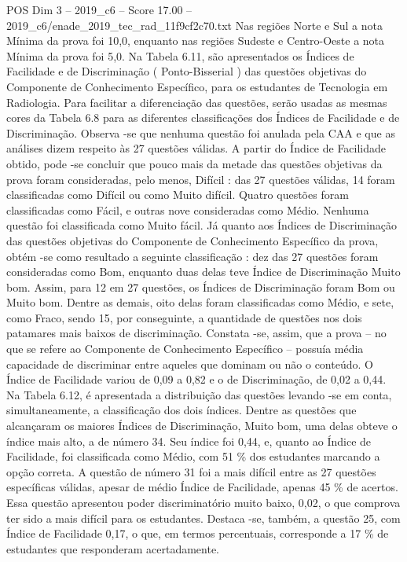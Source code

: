 \begin{textsample}{POS Dim 3 – 2019\_c6 – Score 17.00 – 2019\_c6/enade\_2019\_tec\_rad\_11f9cf2c70.txt}
Nas regiões Norte e Sul a nota Mínima da prova foi 10,0, enquanto nas regiões Sudeste e Centro-Oeste a nota Mínima da prova foi 5,0.
Na Tabela 6.11, são apresentados os Índices de Facilidade e de Discriminação ( Ponto-Bisserial ) das questões objetivas do Componente de Conhecimento Específico, para os estudantes de Tecnologia em Radiologia.
Para facilitar a diferenciação das questões, serão usadas as mesmas cores da Tabela 6.8 para as diferentes classificações dos Índices de Facilidade e de Discriminação.
Observa -se que nenhuma questão foi anulada pela CAA e que as análises dizem respeito às 27 questões válidas.
A partir do Índice de Facilidade obtido, pode -se concluir que pouco mais da metade das questões objetivas da prova foram consideradas, pelo menos, Difícil : das 27 questões válidas, 14 foram classificadas como Difícil ou como Muito difícil.
Quatro questões foram classificadas como Fácil, e outras nove consideradas como Médio.
Nenhuma questão foi classificada como Muito fácil.
Já quanto aos Índices de Discriminação das questões objetivas do Componente de Conhecimento Específico da prova, obtém -se como resultado a seguinte classificação : dez das 27 questões foram consideradas como Bom, enquanto duas delas teve Índice de Discriminação Muito bom.
Assim, para 12 em 27 questões, os Índices de Discriminação foram Bom ou Muito bom.
Dentre as demais, oito delas foram classificadas como Médio, e sete, como Fraco, sendo 15, por conseguinte, a quantidade de questões nos dois patamares mais baixos de discriminação.
Constata -se, assim, que a prova – no que se refere ao Componente de Conhecimento Específico – possuía média capacidade de discriminar entre aqueles que dominam ou não o conteúdo.
O Índice de Facilidade variou de 0,09 a 0,82 e o de Discriminação, de 0,02 a 0,44.
Na Tabela 6.12, é apresentada a distribuição das questões levando -se em conta, simultaneamente, a classificação dos dois índices.
Dentre as questões que alcançaram os maiores Índices de Discriminação, Muito bom, uma delas obteve o índice mais alto, a de número 34.
Seu índice foi 0,44, e, quanto ao Índice de Facilidade, foi classificada como Médio, com 51 \% dos estudantes marcando a opção correta.
A questão de número 31 foi a mais difícil entre as 27 questões específicas válidas, apesar de médio Índice de Facilidade, apenas 45 \% de acertos.
Essa questão apresentou poder discriminatório muito baixo, 0,02, o que comprova ter sido a mais difícil para os estudantes.
Destaca -se, também, a questão 25, com Índice de Facilidade 0,17, o que, em termos percentuais, corresponde a 17 \% de estudantes que responderam acertadamente.

\end{textsample}
